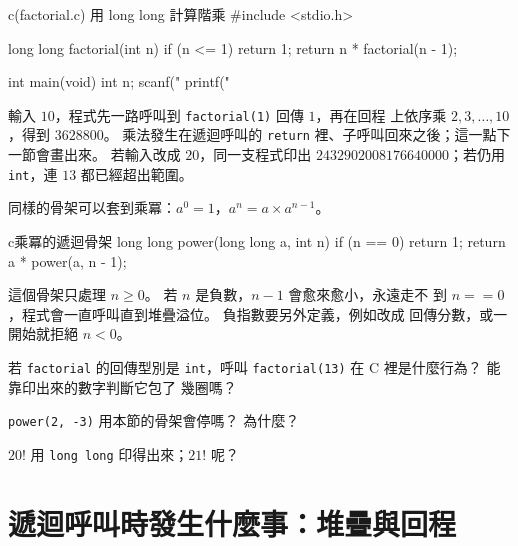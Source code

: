 \begin{example}{c}{(factorial.c) 用 long long 計算階乘}
#include <stdio.h>

long long factorial(int n) {
    if (n <= 1) {
        return 1;
    }
    return n * factorial(n - 1);
}

int main(void) {
    int n;
    scanf("%
    printf("%
}
\end{example}


輸入 $10$，程式先一路呼叫到 \texttt{factorial(1)} 回傳 $1$，再在回程
上依序乘 $2, 3, \ldots, 10$，得到 $3628800$。 乘法發生在遞迴呼叫的
\texttt{return} 裡、子呼叫回來之後；這一點下一節會畫出來。 若輸入改成
$20$，同一支程式印出 $2432902008176640000$；若仍用 \texttt{int}，連
$13$ 都已經超出範圍。

同樣的骨架可以套到乘冪：$a^0 = 1$，$a^n = a \times a^{n-1}$。

\begin{code}{c}{乘冪的遞迴骨架}
long long power(long long a, int n) {
    if (n == 0) {
        return 1;
    }
    return a * power(a, n - 1);
}
\end{code}

這個骨架只處理 $n \ge 0$。 若 $n$ 是負數，$n-1$ 會愈來愈小，永遠走不
到 $n == 0$，程式會一直呼叫直到堆疊溢位。 負指數要另外定義，例如改成
回傳分數，或一開始就拒絕 $n < 0$。


\begin{drills}[label=drills:rec-int]
\item 若 \texttt{factorial} 的回傳型別是 \texttt{int}，呼叫
\texttt{factorial(13)} 在 C 裡是什麼行為？ 能靠印出來的數字判斷它包了
幾圈嗎？
\item \texttt{power(2, -3)} 用本節的骨架會停嗎？ 為什麼？
\item $20!$ 用 \texttt{long long} 印得出來；$21!$ 呢？
\end{drills}

\section{遞迴呼叫時發生什麼事：堆疊與回程}
\label{sec:rec-stack}

